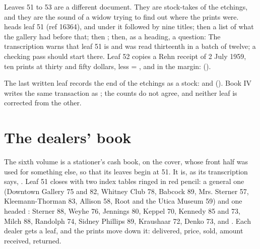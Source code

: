 Leaves 51 to 53 are a different document. They are stock-takes of the etchings, and they are the sound of a widow trying to find out where the prints were.  heads leaf 51 (ref 16364), and under it  followed by nine titles; then a list of what the gallery had before that; then ; then, as a heading, a question:  The transcription warns that leaf 51 is  and was read thirteenth in a batch of twelve; a checking pass should start there. Leaf 52 copies a Rehn receipt of 2 July 1959, ten prints at thirty and fifty dollars,  less  = , and in the margin:  ().

The last written leaf records the end of the etchings as a stock:   and  (). Book IV writes the same transaction as ; the counts do not agree, and neither leaf is corrected from the other.

\section{The dealers' book}

The sixth volume is a stationer's cash book,  on the cover, whose front half was used for something else, so that its leaves begin at 51. It is, as its transcription says, . Leaf 51 closes with two index tables ringed in red pencil: a general one (Downtown Gallery 75 and 82, Whitney Club 78, Babcock 89, Mrs. Sterner 57, Kleemann-Thorman 83, Allison 58, Root and the Utica Museum 59) and one headed : Sterner 88, Weyhe 76, Jennings 80, Keppel 70, Kennedy 85 and 73, Milch 88, Randolph 74, Sidney Phillips 89, Kraushaar 72, Denko 73, and . Each dealer gets a leaf, and the prints move down it: delivered, price, sold, amount received, returned.

